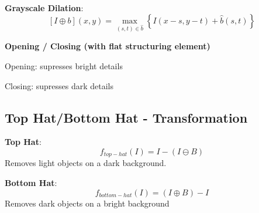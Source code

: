 \textbf{Grayscale Dilation}:
\[
[I \oplus b](x, y) = \max_{(s, t) \in \hat{b}} \left\{ I(x - s, y - t) + \hat{b}(s, t) \right\}
\]

\textbf{Opening / Closing (with flat structuring element)}

Opening: supresses bright details

Closing: supresses dark details

\subsection{Top Hat/Bottom Hat - Transformation}
\textbf{Top Hat}:
\[
f_{top-hat}(I) = I - (I \ominus B)
\]
Removes light objects on a dark background.

\textbf{Bottom Hat}:
\[
f_{bottom-hat}(I) = (I \oplus B) - I
\]
Removes dark objects on a bright
background